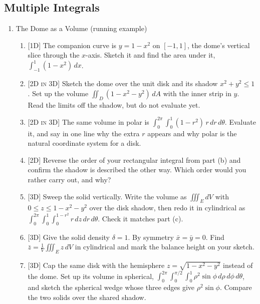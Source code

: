 \documentclass[12pt]{article}
\newcommand{\dimtag}[1]{{\footnotesize\textsc{[#1]}}\;}
\newcounter{topic}
\begin{document}
\subsection*{Multiple Integrals}
\begin{enumerate}\setcounter{enumi}{\value{topic}}

\item The Dome as a Volume (running example)
    \begin{enumerate}
        \item \dimtag{1D} The companion curve is $y = 1 - x^2$ on $[-1,1]$, the dome's vertical slice through the $x$-axis. Sketch it and find the area under it, $\int_{-1}^{1}(1-x^2)\,dx$.
        \item \dimtag{2D in 3D} Sketch the dome over the unit disk and its shadow $x^2+y^2\le 1$. Set up the volume $\iint_D (1-x^2-y^2)\,dA$ with the inner strip in $y$. Read the limits off the shadow, but do not evaluate yet.
        \item \dimtag{2D in 3D} The same volume in polar is $\displaystyle\int_0^{2\pi}\!\int_0^1 (1-r^2)\,r\,dr\,d\theta$. Evaluate it, and say in one line why the extra $r$ appears and why polar is the natural coordinate system for a disk.
        \item \dimtag{2D} Reverse the order of your rectangular integral from part (b) and confirm the shadow is described the other way. Which order would you rather carry out, and why?
        \item \dimtag{3D} Sweep the solid vertically. Write the volume as $\iiint_E dV$ with $0\le z\le 1-x^2-y^2$ over the disk shadow, then redo it in cylindrical as $\displaystyle\int_0^{2\pi}\!\int_0^1\!\int_0^{1-r^2} r\,dz\,dr\,d\theta$. Check it matches part (c).
        \item \dimtag{3D} Give the solid density $\delta = 1$. By symmetry $\bar x = \bar y = 0$. Find $\bar z = \frac{1}{V}\iiint_E z\,dV$ in cylindrical and mark the balance height on your sketch.
        \item \dimtag{3D} Cap the same disk with the hemisphere $z = \sqrt{1-x^2-y^2}$ instead of the dome. Set up its volume in spherical, $\displaystyle\int_0^{2\pi}\!\int_0^{\pi/2}\!\int_0^1 \rho^2\sin\phi\,d\rho\,d\phi\,d\theta$, and sketch the spherical wedge whose three edges give $\rho^2\sin\phi$. Compare the two solids over the shared shadow.
    \end{enumerate}
\newpage


\end{enumerate}
\end{document}
